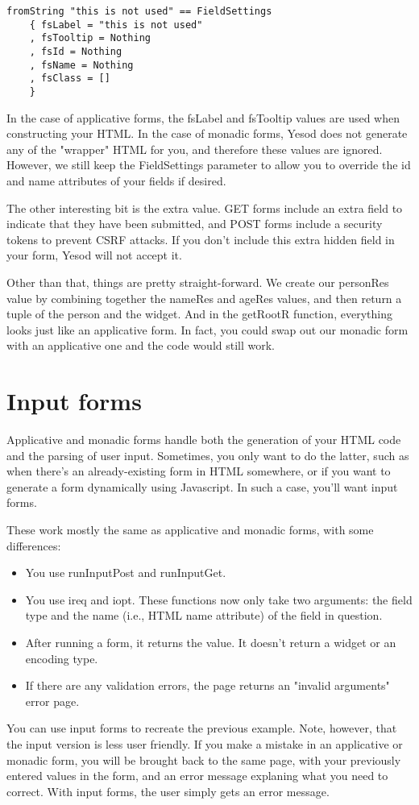 \begin{lstlisting}
fromString "this is not used" == FieldSettings
    { fsLabel = "this is not used"
    , fsTooltip = Nothing
    , fsId = Nothing
    , fsName = Nothing
    , fsClass = []
    }
\end{lstlisting}

In the case of applicative forms, the fsLabel and fsTooltip values are used when
constructing your HTML. In the case of monadic forms, Yesod does not generate any of the
"wrapper" HTML for you, and therefore these values are ignored. However, we still keep the
FieldSettings parameter to allow you to override the id and name attributes of your fields
if desired.

The other interesting bit is the extra value. GET forms include an extra field to indicate
that they have been submitted, and POST forms include a security tokens to prevent CSRF
attacks. If you don't include this extra hidden field in your form, Yesod will not accept
it.

Other than that, things are pretty straight-forward. We create our personRes value by
combining together the nameRes and ageRes values, and then return a tuple of the person
and the widget. And in the getRootR function, everything looks just like an applicative
form. In fact, you could swap out our monadic form with an applicative one and the code
would still work.

\section{Input forms}

Applicative and monadic forms handle both the generation of your HTML code and the parsing
of user input. Sometimes, you only want to do the latter, such as when there's an
already-existing form in HTML somewhere, or if you want to generate a form dynamically
using Javascript. In such a case, you'll want input forms.

These work mostly the same as applicative and monadic forms, with some differences:
\begin{itemize}
 \item You use runInputPost and runInputGet.
 \item You use ireq and iopt. These functions now only take two arguments: the field type
and the name (i.e., HTML name attribute) of the field in question.
 \item  After running a form, it returns the value. It doesn't return a widget or an
encoding type.
 \item  If there are any validation errors, the page returns an "invalid arguments" error
page.
\end{itemize}
You can use input forms to recreate the previous example. Note, however, that the input
version is less user friendly. If you make a mistake in an applicative or monadic form,
you will be brought back to the same page, with your previously entered values in the
form, and an error message explaning what you need to correct. With input forms, the user
simply gets an error message.

